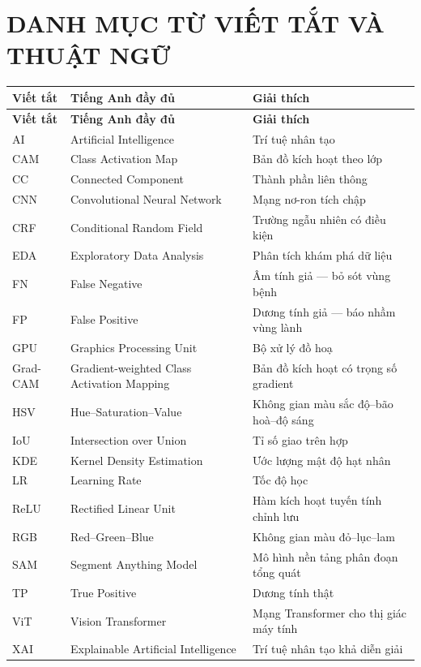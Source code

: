 \chapter*{DANH MỤC TỪ VIẾT TẮT VÀ THUẬT NGỮ}

\begin{longtable}{L{2.6cm} L{4.6cm} L{6.5cm}}
\toprule
\textbf{Viết tắt} & \textbf{Tiếng Anh đầy đủ} & \textbf{Giải thích} \\
\midrule
\endfirsthead
\toprule
\textbf{Viết tắt} & \textbf{Tiếng Anh đầy đủ} & \textbf{Giải thích} \\
\midrule
\endhead
\bottomrule
\endfoot

AI      & Artificial Intelligence            & Trí tuệ nhân tạo \\
CAM     & Class Activation Map               & Bản đồ kích hoạt theo lớp \\
CC      & Connected Component                & Thành phần liên thông \\
CNN     & Convolutional Neural Network       & Mạng nơ-ron tích chập \\
CRF     & Conditional Random Field           & Trường ngẫu nhiên có điều kiện \\
EDA     & Exploratory Data Analysis          & Phân tích khám phá dữ liệu \\
FN      & False Negative                     & Âm tính giả --- bỏ sót vùng bệnh \\
FP      & False Positive                     & Dương tính giả --- báo nhầm vùng lành \\
GPU     & Graphics Processing Unit           & Bộ xử lý đồ hoạ \\
Grad-CAM & Gradient-weighted Class Activation Mapping & Bản đồ kích hoạt có trọng số gradient \\
HSV     & Hue--Saturation--Value             & Không gian màu sắc độ--bão hoà--độ sáng \\
IoU     & Intersection over Union            & Tỉ số giao trên hợp \\
KDE     & Kernel Density Estimation          & Ước lượng mật độ hạt nhân \\
LR      & Learning Rate                      & Tốc độ học \\
ReLU    & Rectified Linear Unit              & Hàm kích hoạt tuyến tính chỉnh lưu \\
RGB     & Red--Green--Blue                   & Không gian màu đỏ--lục--lam \\
SAM     & Segment Anything Model             & Mô hình nền tảng phân đoạn tổng quát \\
TP      & True Positive                      & Dương tính thật \\
ViT     & Vision Transformer                 & Mạng Transformer cho thị giác máy tính \\
XAI     & Explainable Artificial Intelligence & Trí tuệ nhân tạo khả diễn giải \\
\end{longtable}

